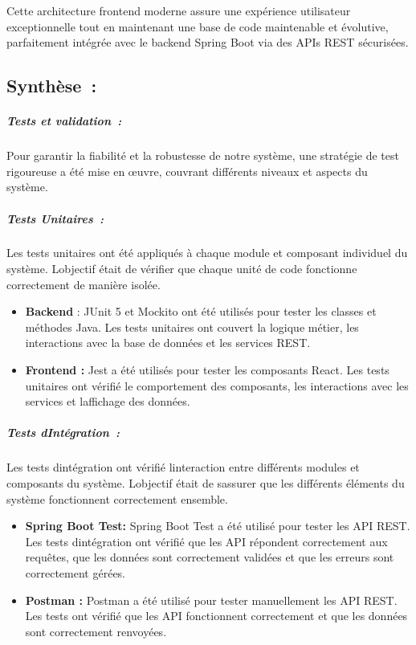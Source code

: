 \documentclass[12pt,a4paper,twoside,openright]{report}
\begin{document}
Cette architecture frontend moderne assure une expérience utilisateur
exceptionnelle tout en maintenant une base de code maintenable et
évolutive, parfaitement intégrée avec le backend Spring Boot via des
APIs REST sécurisées.

\hypertarget{synthuxe8se-1}{%
\subsection{Synthèse~:}\label{synthuxe8se-1}}

\hypertarget{tests-et-validation}{%
\subparagraph{Tests et validation~:}\label{tests-et-validation}}

Pour garantir la fiabilité et la robustesse de notre système, une
stratégie de test rigoureuse a été mise en œuvre, couvrant différents
niveaux et aspects du système.

\hypertarget{tests-unitaires}{%
\subparagraph{Tests Unitaires~:}\label{tests-unitaires}}

Les tests unitaires ont été appliqués à chaque module et composant
individuel du système. L\textquotesingle objectif était de vérifier que
chaque unité de code fonctionne correctement de manière isolée.

\begin{itemize}
\item
  \textbf{Backend} : JUnit 5 et Mockito ont été utilisés pour tester les
  classes et méthodes Java. Les tests unitaires ont couvert la logique
  métier, les interactions avec la base de données et les services REST.
\item
  \textbf{Frontend :} Jest a été utilisés pour tester les composants
  React. Les tests unitaires ont vérifié le comportement des composants,
  les interactions avec les services et l\textquotesingle affichage des
  données.
\end{itemize}

\hypertarget{tests-dintuxe9gration}{%
\subparagraph{Tests
d\textquotesingle Intégration~:}\label{tests-dintuxe9gration}}

Les tests d\textquotesingle intégration ont vérifié
l\textquotesingle interaction entre différents modules et composants du
système. L\textquotesingle objectif était de s\textquotesingle assurer
que les différents éléments du système fonctionnent correctement
ensemble.

\begin{itemize}
\item
  \textbf{Spring Boot Test:} Spring Boot Test a été utilisé pour tester
  les API REST. Les tests d\textquotesingle intégration ont vérifié que
  les API répondent correctement aux requêtes, que les données sont
  correctement validées et que les erreurs sont correctement gérées.
\item
  \textbf{Postman :} Postman a été utilisé pour tester manuellement les
  API REST. Les tests ont vérifié que les API fonctionnent correctement
  et que les données sont correctement renvoyées.
\end{itemize}
\end{document}
